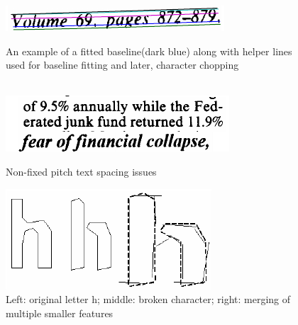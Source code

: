\begin{figure}[t]
\minipage{\textwidth}
    \centering
    \includegraphics[width=0.7\linewidth]{img/textDetection/tesseractBaseline.png}
    \caption{An example of a fitted baseline(dark blue) along with helper lines used for baseline fitting and later, character chopping~\citep{smith2007overview}}
    \label{fig:textRecTesseractBaseline}
\endminipage\\
    \includegraphics[width=\linewidth]{img/textDetection/tesseractSpacing.png}
    \caption{Non-fixed pitch text spacing issues~\citep{smith2007overview}}
    \label{fig:textRecTesseractSpacing}
\endminipage\hfill
{}
    \includegraphics[width=\linewidth]{img/textDetection/tesseractCharacters.png}
    \caption{Left: original letter h; middle: broken character; right: merging of multiple smaller features~\citep{smith2007overview}}
    \label{fig:textRecTesseractChars}
\endminipage
\end{figure}
